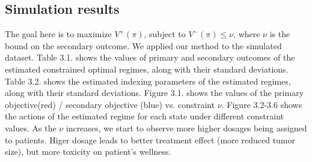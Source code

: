 \documentclass{article}
\begin{document}
\subsection{Simulation results}
The goal here is to maximize $V^{+}(\pi)$, subject to  $V^{-}(\pi) \le \nu$, where $\nu$ is the bound on the secondary outcome. We applied our method to the simulated dataset. Table 3.1. shows the values of primary and secondary outcomes of the estimated constrained optimal regimes, along with their standard deviations. Table 3.2. shows the estimated indexing parameters of the estimated regimes, along with their standard deviations. Figure 3.1. shows the values of the primary objective(red) / secondary objective (blue) vs. constraint $\nu$. Figure 3.2-3.6 shows the actions of the estimated regime for each state under different constraint values. As the $\nu$ increases,  we start to observe more higher dosages being assigned to patients. Higer dosage leads to better treatment effect (more reduced tumor size), but more toxicity on patient's wellness. 
\end{document}
